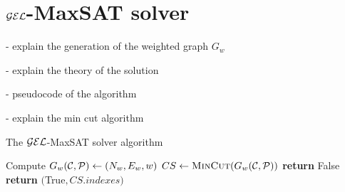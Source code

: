 \section{$\mathcal{GEL}$-MaxSAT solver}

- explain the generation of the weighted graph $G_w$



- explain the theory of the solution

- pseudocode of the algorithm

- explain the min cut algorithm

\begin{algorithm}
	\caption{The $\mathcal{GEL}$-MaxSAT solver algorithm}
	\label{alg:max-sat}
	\begin{algorithmic}[1]
		\State Compute $G_w(\mathcal{C}, \mathcal{P}) \gets (N_w, E_w, w)$
		\State $CS \gets \Call{MinCut}{G_w(\CC, \PP)}$
		\State \textbf{return} False
		\EndIf
		\Statex
		\State \textbf{return} $($True$, CS.indexes)$
		\EndFunction
	\end{algorithmic}
\end{algorithm}



